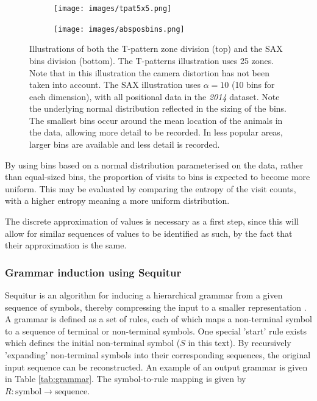 \documentclass[conference,a4paper,twoside]{IEEEtran}
\begin{document}
\begin{figure}
    \centering
    \begin{subfigure}{}
        \texttt{[image: images/tpat5x5.png]}
    \end{subfigure}
    \begin{subfigure}{}
        \texttt{[image: images/absposbins.png]}
    \end{subfigure}
    \caption{Illustrations of both the T-pattern zone division (top) and the SAX bins division (bottom). The T-patterns illustration uses 25 zones. Note that in this illustration the camera distortion has not been taken into account. The SAX illustration uses $\alpha=10$ (10 bins for each dimension), with all positional data in the \emph{2014} dataset. Note the underlying normal distribution reflected in the sizing of the bins. The smallest bins occur around the mean location of the animals in the data, allowing more detail to be recorded. In less popular areas, larger bins are available and less detail is recorded.}
    \label{fig:bins}
\end{figure}

By using bins based on a normal distribution parameterised on the data, rather than equal-sized bins, the proportion of visits to bins is expected to become more uniform. This may be evaluated by comparing the entropy of the visit counts, with a higher entropy meaning a more uniform distribution.

The discrete approximation of values is necessary as a first step, since this will allow for similar sequences of values to be identified as such, by the fact that their approximation is the same.

\subsubsection{Grammar induction using Sequitur}
Sequitur is an algorithm for inducing a hierarchical grammar from a given sequence of symbols, thereby compressing the input to a smaller representation \cite{nevill1997identifying}. A grammar is defined as a set of rules, each of which maps a non-terminal symbol to a sequence of terminal or non-terminal symbols. One special 'start' rule exists which defines the initial non-terminal symbol ($S$ in this text). By recursively 'expanding' non-terminal symbols into their corresponding sequences, the original input sequence can be reconstructed. An example of an output grammar is given in Table \ref{tab:grammar}. The symbol-to-rule mapping is given by $R : \text{symbol} \to \text{sequence}$.
\end{document}
